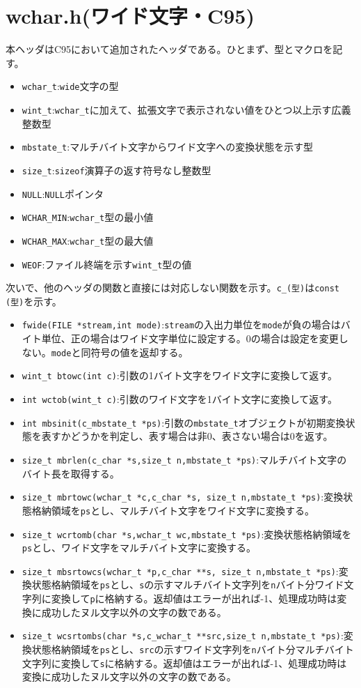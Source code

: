 \section{wchar.h(ワイド文字・C95)}
本ヘッダはC95において追加されたヘッダである。ひとまず、型とマクロを記す。
\begin{itemize}
\item \verb|wchar_t|:\verb|wide|文字の型
\item \verb|wint_t|:\verb|wchar_t|に加えて、拡張文字で表示されない値をひとつ以上示す広義整数型
\item \verb|mbstate_t|:マルチバイト文字からワイド文字への変換状態を示す型
\item \verb|size_t|:\verb|sizeof|演算子の返す符号なし整数型
\item \verb|NULL|:\verb|NULL|ポインタ
\item \verb|WCHAR_MIN|:\verb|wchar_t|型の最小値
\item \verb|WCHAR_MAX|:\verb|wchar_t|型の最大値
\item \verb|WEOF|:ファイル終端を示す\verb|wint_t|型の値
\end{itemize}
次いで、他のヘッダの関数と直接には対応しない関数を示す。\verb|c_(型)|は\verb|const (型)|を示す。
\begin{itemize}
\item \verb|fwide(FILE *stream,int mode)|:\verb|stream|の入出力単位を\verb|mode|が負の場合はバイト単位、正の場合はワイド文字単位に設定する。0の場合は設定を変更しない。\verb|mode|と同符号の値を返却する。
\item \verb|wint_t btowc(int c)|:引数の1バイト文字をワイド文字に変換して返す。
\item \verb|int wctob(wint_t c)|:引数のワイド文字を1バイト文字に変換して返す。
\item \verb|int mbsinit(c_mbstate_t *ps)|:引数の\verb|mbstate_t|オブジェクトが初期変換状態を表すかどうかを判定し、表す場合は非0、表さない場合は0を返す。
\item \verb|size_t mbrlen(c_char *s,size_t n,mbstate_t *ps)|:マルチバイト文字のバイト長を取得する。
\item \verb|size_t mbrtowc(wchar_t *c,c_char *s, size_t n,mbstate_t *ps)|:変換状態格納領域を\verb|ps|とし、マルチバイト文字をワイド文字に変換する。
\item \verb|size_t wcrtomb(char *s,wchar_t wc,mbstate_t *ps)|:変換状態格納領域を\verb|ps|とし、ワイド文字をマルチバイト文字に変換する。
\item \verb|size_t mbsrtowcs(wchar_t *p,c_char **s, size_t n,mbstate_t *ps)|:変換状態格納領域を\verb|ps|とし、\verb|s|の示すマルチバイト文字列を\verb|n|バイト分ワイド文字列に変換して\verb|p|に格納する。返却値はエラーが出れば-1、処理成功時は変換に成功したヌル文字以外の文字の数である。
\item \verb|size_t wcsrtombs(char *s,c_wchar_t **src,size_t n,mbstate_t *ps)|:変換状態格納領域を\verb|ps|とし、\verb|src|の示すワイド文字列を\verb|n|バイト分マルチバイト文字列に変換して\verb|s|に格納する。返却値はエラーが出れば-1、処理成功時は変換に成功したヌル文字以外の文字の数である。
\end{itemize}
